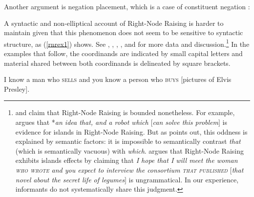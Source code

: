 {\noindent
Another argument is negation placement, which is a case of constituent negation
\citep[253]{Mouret:06}: 

\begin{exe}
 \ex 
 \begin{xlista}
\end{xlista}
\end{exe}


A syntactic and non-elliptical account of Right-Node Raising is harder to maintain given that this phenomenon does not seem to be sensitive to  syntactic structure, as (\ref{rnrex1}) shows. See 
\citet{bresnan74}, \citet[299]{wexlercull},  \citet[45]{grosu81}, \citet{mccawley}, and \citet[382, fn.\ 30]{sab}
for more data and discussion.\footnote{\citet{steedman85,gapsteed,steedmanbook}
and \citet[183]{dowty88} claim that
Right-Node Raising is bounded nonetheless.
For example, \citet{
dowty88} argues that  *\emph{an idea that, and a robot which $[$can solve this problem$]$} is  evidence for islands in Right-Node Raising. But as \citet[95]{phil}
 points out, this oddness is explained by semantic factors: it is impossible to   semantically contrast \emph{that} (which is semantically vacuous) with \emph{which}.
 \citet[17]{steedmanbook}   argues that Right-Node Raising
exhibits islands effects by claiming that \emph{I hope that I will meet the woman
\textsc{who wrote} and you expect to interview the
consortium \textsc{that published} $[$that
novel about the secret life of legumes$]$} is ungrammatical.
In our experience, informants do not systematically share this judgment.}
In the examples that follow, the coordinands are indicated by small capital letters and material shared between both coordinands is delineated by square brackets.


\begin{exe}
\ex
\begin{xlista}
\ex  I know a man who \textsc{sells} and you know a person who \textsc{buys}
                     [pictures of Elvis Presley].


\end{xlista}
\end{exe}}
